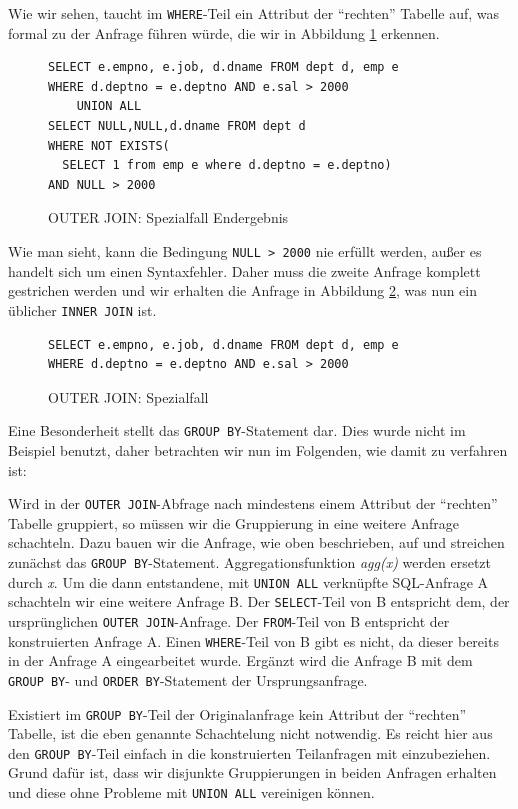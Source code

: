 Wie wir sehen, taucht im \verb|WHERE|-Teil ein Attribut der ``rechten'' Tabelle auf, was formal zu der Anfrage führen würde, die wir in Abbildung \ref{fig:outer_s2} erkennen.

\begin{figure}[H]
\begin{verbatim}
SELECT e.empno, e.job, d.dname FROM dept d, emp e
WHERE d.deptno = e.deptno AND e.sal > 2000
    UNION ALL
SELECT NULL,NULL,d.dname FROM dept d 
WHERE NOT EXISTS(
  SELECT 1 from emp e where d.deptno = e.deptno)
AND NULL > 2000
\end{verbatim}
\caption{OUTER JOIN: Spezialfall Endergebnis}
\label{fig:outer_s2}
\end{figure}

Wie man sieht, kann die Bedingung \verb|NULL > 2000| nie erfüllt werden, außer es handelt sich um einen Syntaxfehler. Daher muss die zweite Anfrage komplett gestrichen werden und wir erhalten die Anfrage in Abbildung \ref{fig:outjoinspez2}, was nun ein üblicher \verb|INNER JOIN| ist.

\begin{figure}[H]
\begin{verbatim}
SELECT e.empno, e.job, d.dname FROM dept d, emp e
WHERE d.deptno = e.deptno AND e.sal > 2000
\end{verbatim}
\caption{OUTER JOIN: Spezialfall}
\label{fig:outjoinspez2}
\end{figure}


Eine Besonderheit stellt das \verb|GROUP BY|-Statement dar. Dies wurde nicht im Beispiel benutzt, daher betrachten wir nun im Folgenden, wie damit zu verfahren ist:

Wird in der \verb|OUTER JOIN|-Abfrage nach mindestens einem Attribut der ``rechten'' Tabelle gruppiert, so müssen wir die Gruppierung in eine weitere Anfrage schachteln. Dazu bauen wir die Anfrage, wie oben beschrieben, auf und streichen zunächst das \verb|GROUP BY|-Statement. Aggregationsfunktion \textit{agg(x)} werden ersetzt durch \textit{x}. Um die dann entstandene, mit \verb|UNION ALL| verknüpfte SQL-Anfrage A schachteln wir eine weitere Anfrage B. Der \verb|SELECT|-Teil von B entspricht dem, der ursprünglichen \verb|OUTER JOIN|-Anfrage. Der \verb|FROM|-Teil von B entspricht der konstruierten Anfrage A. Einen \verb|WHERE|-Teil von B gibt es nicht, da dieser bereits in der Anfrage A eingearbeitet wurde. Ergänzt wird die Anfrage B mit dem \verb|GROUP BY|- und \verb|ORDER BY|-Statement der Ursprungsanfrage.

Existiert im \verb|GROUP BY|-Teil der Originalanfrage kein Attribut der ``rechten'' Tabelle, ist die eben genannte Schachtelung nicht notwendig. Es reicht hier aus den \verb|GROUP BY|-Teil einfach in die konstruierten Teilanfragen mit einzubeziehen. Grund dafür ist, dass wir disjunkte Gruppierungen in beiden Anfragen erhalten und diese ohne Probleme mit \verb|UNION ALL| vereinigen können.

